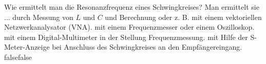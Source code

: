     {Wie ermittelt man die Resonanzfrequenz eines Schwingkreises? Man ermittelt sie ...}
    {durch Messung von $L$ und $C$ und Berechnung oder z. B. mit einem vektoriellen Netzwerkanalysator (VNA).}
    {mit einem Frequenzmesser oder einem Oszilloskop.}
    {mit einem Digital-Multimeter in der Stellung Frequenzmessung.}
    {mit Hilfe der S-Meter-Anzeige bei Anschluss des Schwingkreises an den Empfängereingang.}
    {false}{false}